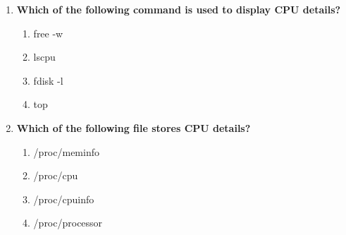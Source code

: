 \begin{flushleft}
\begin{enumerate}
		\item \textbf{Which of the following command is used to display CPU details?}
		\begin{enumerate}[label=(\alph*)]
			\item free -w 
			\item lscpu    %
			\item fdisk -l
			\item top
		\end{enumerate}
		\bigskip
		\bigskip	
		
		
		\item \textbf{Which of the following file stores CPU details?}
		\begin{enumerate}[label=(\alph*)]
			\item /proc/meminfo
			\item /proc/cpu
			\item /proc/cpuinfo   %
			\item /proc/processor
		\end{enumerate}
		\bigskip
		\bigskip	
		
	\end{enumerate}
	
	
\end{flushleft}

\newpage

